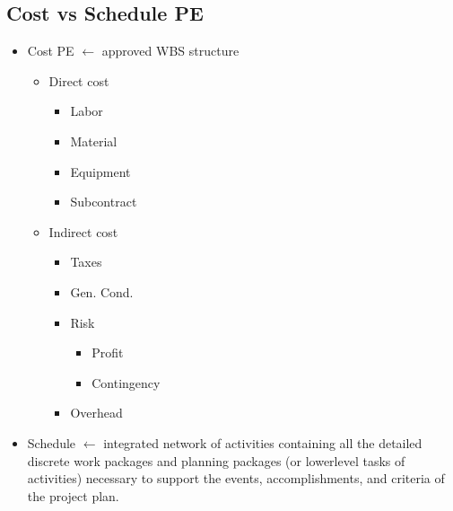 \documentclass[letterpaper,10pt,english]{jupyterBook}
\begin{document}
\subsection{Cost vs Schedule PE}
\label{\detokenize{PM/jcsrua:cost-vs-schedule-pe}}\begin{itemize}
\item {} 
\sphinxAtStartPar
Cost PE \(\leftarrow\) approved WBS structure
\begin{itemize}
\item {} 
\sphinxAtStartPar
Direct cost
\begin{itemize}
\item {} 
\sphinxAtStartPar
Labor

\item {} 
\sphinxAtStartPar
Material

\item {} 
\sphinxAtStartPar
Equipment

\item {} 
\sphinxAtStartPar
Subcontract

\end{itemize}

\item {} 
\sphinxAtStartPar
Indirect cost
\begin{itemize}
\item {} 
\sphinxAtStartPar
Taxes

\item {} 
\sphinxAtStartPar
Gen. Cond.

\item {} 
\sphinxAtStartPar
Risk
\begin{itemize}
\item {} 
\sphinxAtStartPar
Profit

\item {} 
\sphinxAtStartPar
Contingency

\end{itemize}

\item {} 
\sphinxAtStartPar
Overhead

\end{itemize}

\end{itemize}

\item {} 
\sphinxAtStartPar
Schedule \(\leftarrow\) integrated network of activities containing all the detailed discrete work packages and planning packages (or lower\sphinxhyphen{}level tasks of activities) necessary to support the events, accomplishments, and criteria of the project plan.

\end{itemize}
\end{document}

